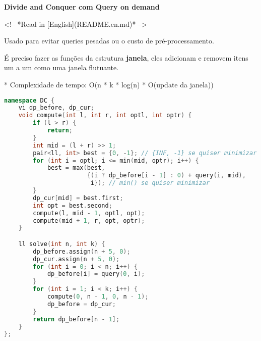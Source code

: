 \documentclass[11pt, a4paper, oneside]{book}
\begin{document}
\textbf{Divide and Conquer com Query on demand} 



<!-- *Read in [English](README.en.md)* -->



Usado para evitar queries pesadas ou o custo de pré-processamento.  

É preciso fazer as funções da estrutura \textbf{janela}, eles adicionam e removem itens um a um como uma janela flutuante.



* Complexidade de tempo: O(n * k * log(n) * O(update da janela))





\hfill

\begin{multicols}{2}
\begin{lstlisting}[language=C++]
namespace DC {
    vi dp_before, dp_cur;
    void compute(int l, int r, int optl, int optr) {
        if (l > r) {
            return;
        }
        int mid = (l + r) >> 1;
        pair<ll, int> best = {0, -1}; // {INF, -1} se quiser minimizar
        for (int i = optl; i <= min(mid, optr); i++) {
            best = max(best,
                       {(i ? dp_before[i - 1] : 0) + query(i, mid),
                        i}); // min() se quiser minimizar
        }
        dp_cur[mid] = best.first;
        int opt = best.second;
        compute(l, mid - 1, optl, opt);
        compute(mid + 1, r, opt, optr);
    }

    ll solve(int n, int k) {
        dp_before.assign(n + 5, 0);
        dp_cur.assign(n + 5, 0);
        for (int i = 0; i < n; i++) {
            dp_before[i] = query(0, i);
        }
        for (int i = 1; i < k; i++) {
            compute(0, n - 1, 0, n - 1);
            dp_before = dp_cur;
        }
        return dp_before[n - 1];
    }
};
\end{lstlisting}
\end{multicols}

\hfill
\end{document}
